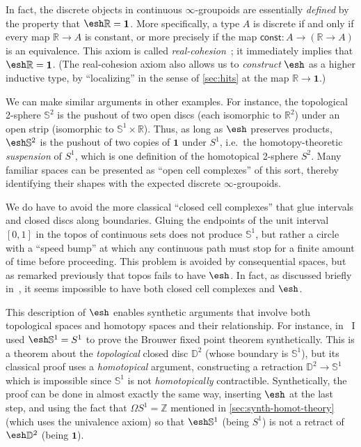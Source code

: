 \documentclass[12pt]{article}
\def\oo{\ensuremath{\infty}}
\def\Z{\mathbb{Z}}
\def\R{\mathbb{R}}
\def\hocirc{S^1}
\def\topcirc{\mathbb{S}^1}
\def\hosph{S^2}
\def\topsph{\mathbb{S}^2}
\def\topdisc{\mathbb{D}^2}
\def\unit{\mathbf{1}}
\numberwithin{equation}{section}
\newcommand{\shape}{\ensuremath{\mathord{\raisebox{0.5pt}{\text{\rm\esh}}}}}
\begin{document}
In fact, the discrete objects in continuous $\oo$-groupoids are essentially \emph{defined} by the property that $\shape\R=\unit$.
More specifically, a type $A$ is discrete if and only if every map $\R\to A$ is constant, or more precisely if the map $\mathsf{const}:A \to (\R\to A)$ is an equivalence.
This axiom is called \emph{real-cohesion}~\cite{shulman:bfp-realcohesion}; it immediately implies that $\shape \R=\unit$.
(The real-cohesion axiom also allows us to \emph{construct} $\shape$ as a higher inductive type, by ``localizing'' in the sense of \cref{sec:hits} at the map $\R\to \unit$.)

We can make similar arguments in other examples.
For instance, the topological 2-sphere $\topsph$ is the pushout of two open discs (each isomorphic to $\R^2$) under an open strip (isomorphic to $\topcirc \times \R$).
Thus, as long as $\shape$ preserves products, $\shape\topsph$ is the pushout of two copies of $\unit$ under $\hocirc$, i.e.\ the homotopy-theoretic \emph{suspension} of $\hocirc$, which is one definition of the homotopical 2-sphere $\hosph$.
Many familiar spaces can be presented as ``open cell complexes'' of this sort, thereby identifying their shapes with the expected discrete \oo-groupoids.

We do have to avoid the more classical ``closed cell complexes'' that glue intervals and closed discs along boundaries.
Gluing the endpoints of the unit interval $[0,1]$ in the topos of continuous sets does not produce $\topcirc$, but rather a circle with a ``speed bump'' at which any continuous path must stop for a finite amount of time before proceeding.
This problem is avoided by consequential spaces, but as remarked previously that topos fails to have $\shape$.
In fact, as discussed briefly in~\cite{ptj:topological-topos}, it seems impossible to have both closed cell complexes and $\shape$.

This description of $\shape$ enables synthetic arguments that involve both topological spaces and homotopy spaces and their relationship.
For instance, in~\cite{shulman:bfp-realcohesion} I used $\shape\topcirc = \hocirc$ to prove the Brouwer fixed point theorem synthetically.
This is a theorem about the \emph{topological} closed disc $\topdisc$ (whose boundary is $\topcirc$), but its classical proof uses a \emph{homotopical} argument, constructing a retraction $\topdisc \to \topcirc$ which is impossible since $\topcirc$ is not \emph{homotopically} contractible.
Synthetically, the proof can be done in almost exactly the same way, inserting $\shape$ at the last step, and using the fact that $\Omega\hocirc = \Z$ mentioned in \cref{sec:synth-homot-theory} (which uses the univalence axiom) so that $\shape\topcirc$ (being $\hocirc$) is not a retract of $\shape \topdisc$ (being $\unit$).
\end{document}
